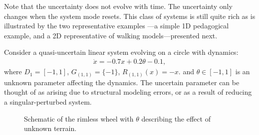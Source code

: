 Note that the uncertainty does not evolve with time.
The uncertainty only changes when the system mode resets.
This class of systems is still quite rich as is illustrated by the two representative examples ---a simple 1D pedagogical example, and a 2D representative of walking models---presented next.
\begin{example}
\label{example:1D}
Consider a quasi-uncertain linear system evolving on a circle with dynamics:
\begin{align}
	\dot x = -0.7x+0.2\theta-0.1,
\end{align}
where $D_1 = [-1,1]$, $G_{(1,1)} = \{-1\}$, $R_{(1,1)}(x) = -x$. and $\theta\in [-1,1]$ is an unknown parameter affecting the dynamics. 
The uncertain parameter can be thought of as arising due to structural modeling errors, or as a result of reducing a singular-perturbed system.
\end{example}
\begin{figure}[!t]
\centering
  \caption{Schematic of the rimless wheel with $\theta$ describing the effect of unknown terrain.}
  \label{fig:rw_schematic}
\end{figure}

